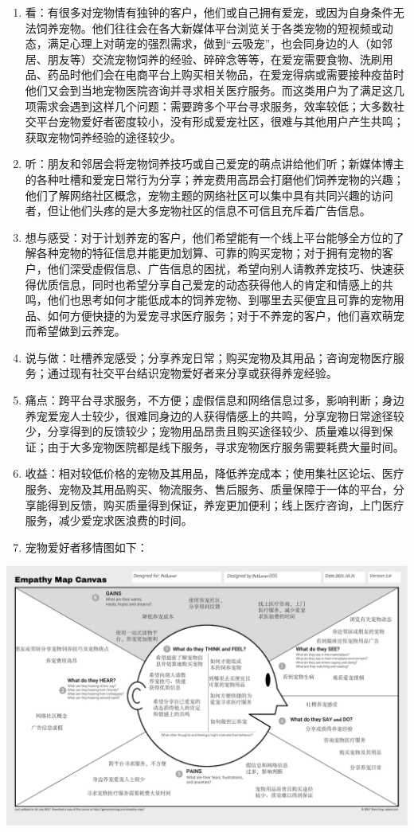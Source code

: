 \documentclass[a4paper]{ctexart}
\begin{document}
\begin{enumerate}[label=\alph*.]
  \item 看：有很多对宠物情有独钟的客户，他们或自己拥有爱宠，或因为自身条件无法饲养宠物。他们往往会在各大新媒体平台浏览关于各类宠物的短视频或动态，满足心理上对萌宠的强烈需求，做到“云吸宠”，也会同身边的人（如邻居、朋友等）交流宠物饲养的经验、碎碎念等等，在爱宠需要食物、洗刷用品、药品时他们会在电商平台上购买相关物品，在爱宠得病或需要接种疫苗时他们又会到当地宠物医院咨询并寻求相关医疗服务。而这类用户为了满足这几项需求会遇到这样几个问题：需要跨多个平台寻求服务，效率较低；大多数社交平台宠物爱好者密度较小，没有形成爱宠社区，很难与其他用户产生共鸣；获取宠物饲养经验的途径较少。
  \item 听：朋友和邻居会将宠物饲养技巧或自己爱宠的萌点讲给他们听；新媒体博主的各种吐槽和爱宠日常行为分享；养宠费用高昂会打磨他们饲养宠物的兴趣；他们了解网络社区概念，宠物主题的网络社区可以集中具有共同兴趣的访问者，但让他们头疼的是大多宠物社区的信息不可信且充斥着广告信息。
  \item 想与感受：对于计划养宠的客户，他们希望能有一个线上平台能够全方位的了解各种宠物的特征信息并能更加划算、可靠的购买宠物；对于拥有宠物的客户，他们深受虚假信息、广告信息的困扰，希望向别人请教养宠技巧、快速获得优质信息，同时也希望分享自己爱宠的动态获得他人的肯定和情感上的共鸣，他们也思考如何才能低成本的饲养宠物、到哪里去买便宜且可靠的宠物用品、如何方便快捷的为爱宠寻求医疗服务；对于不养宠的客户，他们喜欢萌宠而希望做到云养宠。
  \item 说与做：吐槽养宠感受；分享养宠日常；购买宠物及其用品；咨询宠物医疗服务；通过现有社交平台结识宠物爱好者来分享或获得养宠经验。
  \item 痛点：跨平台寻求服务，不方便；虚假信息和网络信息过多，影响判断；身边养宠爱宠人士较少，很难同身边的人获得情感上的共鸣，分享宠物日常途径较少，分享得到的反馈较少；宠物用品昂贵且购买途径较少、质量难以得到保证；由于大多宠物医院都是线下服务，寻求宠物医疗服务需要耗费大量时间。
  \item 收益：相对较低价格的宠物及其用品，降低养宠成本；使用集社区论坛、医疗服务、宠物及其用品购买、物流服务、售后服务、质量保障于一体的平台，分享能得到反馈，购买质量得到保证，养宠更加便利；线上医疗咨询，上门医疗服务，减少爱宠求医浪费的时间。
  \item 宠物爱好者移情图如下：
\end{enumerate}
\begin{center}
  \includegraphics[width=16cm]{./移情图/宠物爱好者}
\end{center}
\end{document}
